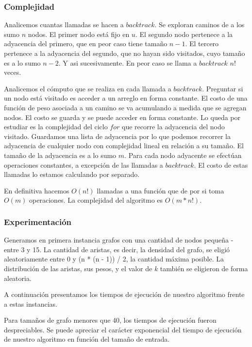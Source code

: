 \subsubsection{Complejidad}

Analicemos cuantas llamadas se hacen a $backtrack$. Se exploran caminos de a los sumo $n$ nodos. El primer nodo está fijo en $u$. El segundo nodo
pertenece a la adyacencia del primero, que en peor caso tiene tamaño $n - 1$. El tercero pertenece a la adyacencia del segundo, que no hayan sido
visitados, cuyo tamaño es a lo sumo $n - 2$. Y asi sucesivamente. En peor caso se llama a $backtrack$ $n!$ veces.

Analicemos el cómputo que se realiza en cada llamada a $backtrack$. Preguntar si un nodo está visitado es acceder a un arreglo en forma constante.
El costo de una función de peso asociada a un camino se va acumulando a medida que se agregan nodos. El costo se guarda y se puede acceder en
forma constante. Lo queda por estudiar es la complejidad del ciclo $for$ que recorre la adyacencia del nodo visitado. Guardamos una lista de
adyacencia por lo que podemos recorrer la adyacencia de cualquier nodo con complejidad lineal en relación a su tamaño. El tamaño de la adyacencia
es a lo sumo $m$. Para cada nodo adyacente se efectúan operaciones constantes, a excepción de las llamadas a $backtrack$. El costo de estas
llamadas lo estamos calculando por separado.

En definitiva hacemos $O(n!)$ llamadas a una función que de por si toma $O(m)$ operaciones. La complejidad del algoritmo es $O(m*n!)$.

\subsubsection{Experimentación}

Generamos en primera instancia grafos con una cantidad de nodos pequeña - entre 3 y 15. La cantidad de aristas, es decir, la densidad del grafo,
se eligió aleatoriamente entre 0 y (n * (n - 1)) / 2, la cantidad máxima posible. La distribución de las aristas, sus pesos, y el valor de $k$
también se eligieron de forma aleatoria.

A continuación presentamos los tiempos de ejecución de nuestro algoritmo frente a estas instancias. 



Para tamaños de grafo menores que 40, los tiempos de ejecución fueron despreciables. Se puede apreciar el carácter exponencial del tiempo de
ejecución de nuestro algoritmo en función del tamaño de entrada.

